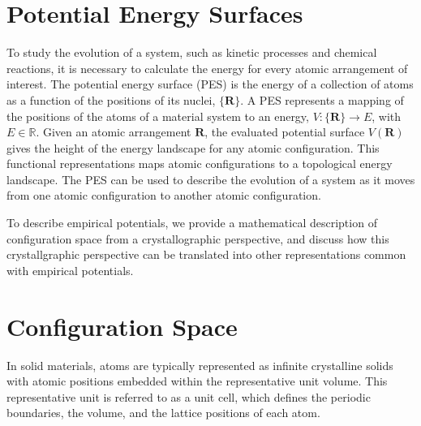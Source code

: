 \section{Potential Energy Surfaces}

To study the evolution of a system, such as kinetic processes and chemical reactions, it is necessary to calculate the energy for every atomic arrangement of interest.  The potential energy surface (PES) is the energy of a collection of atoms as a function of the positions of its nuclei, $\{\bm{R}\}$.
A PES represents a mapping of the positions of the atoms of a material system to an energy, $V:\{\bm{R}\}\rightarrow E$, with $E\in\mathbb{R}$.
Given an atomic arrangement $\bm{R}$, the evaluated potential surface $V(\bm{R})$ gives the height of the energy landscape for any atomic configuration.
This functional representations maps atomic configurations to a topological energy landscape.  The PES can be used to describe the evolution of a system as it moves from one atomic configuration to another atomic configuration.

To describe empirical potentials, we provide a mathematical description of configuration space from a crystallographic perspective, and discuss how this crystallgraphic perspective can be translated into other representations common with empirical potentials.

\section{Configuration Space}
\label{sec:configuration_space}
In solid materials, atoms are typically represented as infinite crystalline solids with atomic positions embedded within the representative unit volume.
This representative unit is referred to as a unit cell, which defines the periodic boundaries, the volume, and the lattice positions of each atom.

